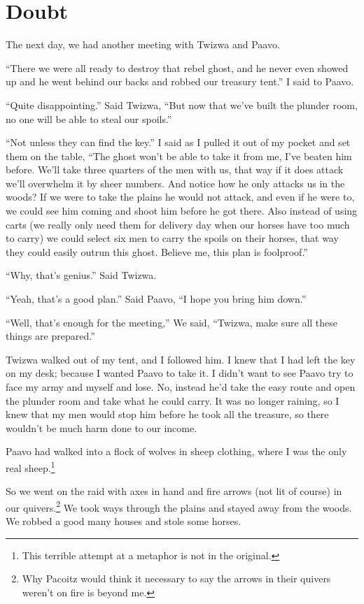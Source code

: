 \chapter{Doubt}

The next day, we had another meeting with Twizwa and Paavo.

``There we were all ready to destroy that rebel ghost, and he never even showed up and he went behind our backs and robbed our treasury tent.'' I said to Paavo.

``Quite disappointing.'' Said Twizwa, ``But now that we've built the plunder room, no one will be able to steal our spoils.''

``Not unless they can find the key.'' I said as I pulled it out of my pocket and set them on the table, ``The ghost won't be able to take it from me, I've beaten him before. We'll take three quarters of the men with us, that way if it does attack we'll overwhelm it by sheer numbers. And notice how he only attacks us in the woods? If we were to take the plains he would not attack, and even if he were to, we could see him coming and shoot him before he got there. Also instead of using carts (we really only need them for delivery day when our horses have too much to carry) we could select six men to carry the spoils on their horses, that way they could easily outrun this ghost. Believe me, this plan is foolproof.''

``Why, that's genius.'' Said Twizwa.

``Yeah, that's a good plan.'' Said Paavo, ``I hope you bring him down.''

``Well, that's enough for the meeting,'' We said, ``Twizwa, make sure all these things are prepared.''

Twizwa walked out of my tent, and I followed him. I knew that I had left the key on my desk; because I wanted Paavo to take it. I didn't want to see Paavo try to face my army and myself and lose. No, instead he'd take the easy route and open the plunder room and take what he could carry. It was no longer raining, so I knew that my men would stop him before he took all the treasure, so there wouldn't be much harm done to our income.

Paavo had walked into a flock of wolves in sheep clothing, where I was the only real sheep.\footnote{This terrible attempt at a metaphor is not in the original.} 

So we went on the raid with axes in hand and fire arrows (not lit of course) in our quivers.\footnote{Why Pacoitz would think it necessary to say the arrows in their quivers weren't on fire is beyond me.} We took ways through the plains and stayed away from the woods. We robbed a good many houses and stole some horses.

